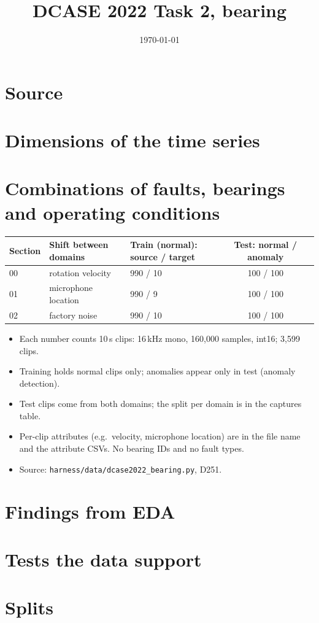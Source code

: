 \documentclass[11pt,a4paper]{article}
\title{DCASE 2022 Task 2, bearing}
\author{}
\date{\today}
\begin{document}
\maketitle

\section{Source}

\section{Dimensions of the time series}

\section{Combinations of faults, bearings and operating conditions}

\begin{table}[h]
\centering
\small
\begin{tabular}{lllcc}
\toprule
Section & Shift between domains & Train (normal): source / target & Test: normal / anomaly \\
\midrule
00 & rotation velocity   & 990 / 10 & 100 / 100 \\
01 & microphone location & 990 / 9  & 100 / 100 \\
02 & factory noise       & 990 / 10 & 100 / 100 \\
\bottomrule
\end{tabular}
\end{table}

\begin{itemize}
  \item Each number counts 10\,s clips: 16\,kHz mono, 160,000 samples, int16; 3,599 clips.
  \item Training holds normal clips only; anomalies appear only in test (anomaly detection).
  \item Test clips come from both domains; the split per domain is in the captures table.
  \item Per-clip attributes (e.g.\ velocity, microphone location) are in the file name and
        the attribute CSVs. No bearing IDs and no fault types.
  \item Source: \texttt{harness/data/dcase2022\_bearing.py}, D251.
\end{itemize}

\section{Findings from EDA}

\section{Tests the data support}

\section{Splits}
\end{document}
